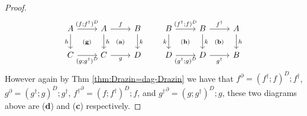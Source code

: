 \documentclass[submission,copyright,creativecommons]{eptcs}
\begin{document}
\begin{proof}
\[
  \begin{tikzcd}
	A & A & B \\
	C & C & D
	\arrow["{(f;f^\dagger)^D}", from=1-1, to=1-2]
	\arrow["h"', from=1-1, to=2-1]
	\arrow["{{(\textbf{g})}}"{description}, draw=none, from=1-1, to=2-2]
	\arrow["f", from=1-2, to=1-3]
	\arrow["h", from=1-2, to=2-2]
	\arrow["{{(\textbf{a})}}"{description}, draw=none, from=1-2, to=2-3]
	\arrow["k", from=1-3, to=2-3]
	\arrow["{(g;g^\dagger)^D}"', from=2-1, to=2-2]
	\arrow["g"', from=2-2, to=2-3]
\end{tikzcd} \qquad  \begin{tikzcd}
	B & B & A \\
	D & D & B
	\arrow["{(f^\dagger;f)^D}", from=1-1, to=1-2]
	\arrow["k"', from=1-1, to=2-1]
	\arrow["{{(\textbf{h})}}"{description}, draw=none, from=1-1, to=2-2]
	\arrow["{f^\dagger}", from=1-2, to=1-3]
	\arrow["k", from=1-2, to=2-2]
	\arrow["{{(\textbf{b})}}"{description}, draw=none, from=1-2, to=2-3]
	\arrow["h", from=1-3, to=2-3]
	\arrow["{(g^\dagger;g)^D}"', from=2-1, to=2-2]
	\arrow["{g^\dagger}"', from=2-2, to=2-3]
\end{tikzcd} \]
However again by Thm \ref{thm:Drazin=dag-Drazin} we have that $f^\partial = (f^\dagger ;f)^D ;f^\dagger$, $g^\partial = (g^\dagger ;g)^D ;g^\dagger$, ${f^\dagger}^\partial = (f ;f^\dagger)^D ;f$, and ${g^\dagger}^\partial = (g ;g^\dagger)^D ;g$, these two diagrams above are (\textbf{d}) and (\textbf{c}) respectively. 
\end{proof}
\end{document}
